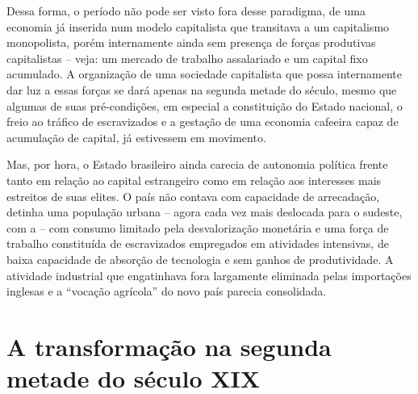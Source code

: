 Dessa forma, o período não pode ser visto fora desse paradigma, de uma
economia já inserida num modelo capitalista que transitava a um
capitalismo monopolista, porém internamente ainda sem presença de forças
produtivas capitalistas
\citep{mello1982} --
veja: um mercado de trabalho assalariado e um capital fixo acumulado. A
organização de uma sociedade capitalista que possa internamente dar luz
a essas forças se dará apenas na segunda metade do século, mesmo que
algumas de suas pré-condições, em especial a constituição do Estado
nacional, o freio ao tráfico de escravizados e a gestação de uma
economia cafeeira capaz de acumulação de capital, já estivessem em
movimento.


Mas, por hora, o Estado brasileiro ainda carecia de autonomia política
frente tanto em relação ao capital estrangeiro como em relação aos
interesses mais estreitos de suas elites. O país não contava com
capacidade de arrecadação, detinha uma população urbana -- agora cada
vez mais deslocada para o sudeste, com a  -- com consumo limitado pela desvalorização
monetária e uma força de trabalho constituída de escravizados empregados
em atividades intensivas, de baixa capacidade de absorção de tecnologia
e sem ganhos de produtividade. A atividade industrial que engatinhava
fora largamente eliminada pelas importações inglesas
\citep{pradojunior2012}
e a ``vocação agrícola'' do novo país parecia consolidada.

\section{A transformação na segunda metade do século XIX}\label{a-transformauxe7uxe3o-na-segunda-metade-do-suxe9culo-xix}


